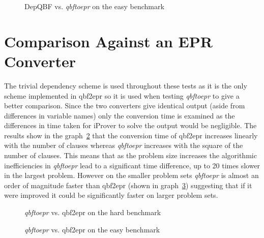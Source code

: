 \begin{figure}[h]
\caption{DepQBF vs. \textit{qbftoepr} on the easy benchmark}
\label{depqbfvsqbftoeprgraph}
\begin{CenteredBox}

\end{CenteredBox}
\end{figure}

\section{Comparison Against an EPR Converter}
The trivial dependency scheme is used throughout these tests as it is the only scheme implemented in qbf2epr so it is used when testing \textit{qbftoepr} to give a better comparison. Since the two converters give identical output (aside from differences in variable names) only the conversion time is examined as the differences in time taken for iProver to solve the output would be negligible. The results show in the graph~\ref{qbftoeprvsqbf2eprhard} that the conversion time of qbf2epr increases linearly with the number of clauses whereas \textit{qbftoepr} increases with the square of the number of clauses. This means that as the problem size increases the algorithmic inefficiencies in \textit{qbftoepr} lead to a significant time difference, up to 20 times slower in the largest problem. However on the smaller problem sets \textit{qbftoepr} is almost an order of magnitude faster than qbf2epr (shown in graph~\ref{qbftoeprvsqbf2epreasy}) suggesting that if it were improved it could be significantly faster on larger problem sets.

\begin{figure}[h]
\caption{\textit{qbftoepr} vs. qbf2epr on the hard benchmark}
\label{qbftoeprvsqbf2eprhard}
\begin{CenteredBox}

\end{CenteredBox}
\end{figure}

\begin{figure}[h]
\caption{\textit{qbftoepr} vs. qbf2epr on the easy benchmark}
\label{qbftoeprvsqbf2epreasy}
\begin{CenteredBox}

\end{CenteredBox}
\end{figure}
